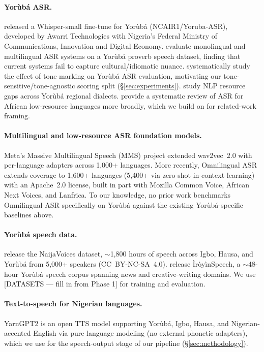 \paragraph{Yor\`ub\'a ASR.} \citet{ncair-yoruba-asr} released a Whisper-small
fine-tune for Yor\`ub\'a (NCAIR1/Yoruba-ASR), developed by Awarri
Technologies with Nigeria's Federal Ministry of Communications, Innovation
and Digital Economy. \citet{owe-voice} evaluate monolingual and
multilingual ASR systems on a Yor\`ub\'a proverb speech dataset, finding
that current systems fail to capture cultural/idiomatic nuance.
\citet{tone-yoruba-asr} systematically study the effect of tone marking on
Yor\`ub\'a ASR evaluation, motivating our tone-sensitive/tone-agnostic
scoring split (\S\ref{sec:experiments}). \citet{voices-unheard-yoruba} study
NLP resource gaps across Yor\`ub\'a regional dialects. \citet{african-asr-survey}
provide a systematic review of ASR for African low-resource languages more
broadly, which we build on for related-work framing.

\paragraph{Multilingual and low-resource ASR foundation models.} Meta's
Massive Multilingual Speech (MMS) project \citep{mms} extended wav2vec~2.0
with per-language adapters across 1,000+ languages. More recently,
Omnilingual ASR \citep{omnilingual2025} extends coverage to 1,600+ languages
(5,400+ via zero-shot in-context learning) with an Apache~2.0 license,
built in part with Mozilla Common Voice, African Next Voices, and Lanfrica.
To our knowledge, no prior work benchmarks Omnilingual ASR specifically on
Yor\`ub\'a against the existing Yor\`ub\'a-specific baselines above.

\paragraph{Yor\`ub\'a speech data.} \citet{naijavoices} release the
NaijaVoices dataset, $\sim$1,800 hours of speech across Igbo, Hausa, and
Yor\`ub\'a from 5,000+ speakers (CC~BY-NC-SA~4.0). \citet{iroyinspeech}
release \`Ir\`oy\`inSpeech, a $\sim$48-hour Yor\`ub\'a speech corpus spanning
news and creative-writing domains. We use [DATASETS — fill in from Phase 1]
for training and evaluation.

\paragraph{Text-to-speech for Nigerian languages.} YarnGPT2
\citep{yarngpt2} is an open TTS model supporting Yor\`ub\'a, Igbo, Hausa,
and Nigerian-accented English via pure language modeling (no external
phonetic adapters), which we use for the speech-output stage of our
pipeline (\S\ref{sec:methodology}).

